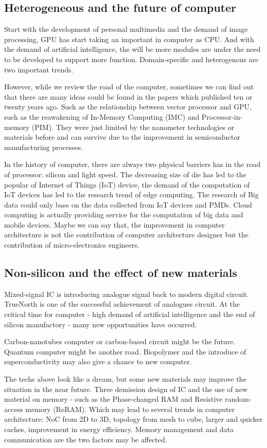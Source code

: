 \subsection{Heterogeneous and the future of computer}
\par Start with the development of personal multimedia and the demand of image processing, GPU has start taking an important in computer as CPU. And with the demand of artificial intelligence, the will be more modules are under the need to be developed to support more function. Domain-specific and heterogenous are two important trends\cite{chung2010single}\cite{hennessy2017computer}\cite{taylor2012dark}. 
\par However, while we review the road of the computer, sometimes we can find out that there are many ideas could be found in the papers which published ten or twenty years ago. Such as the relationship between vector processor and GPU, such as the reawakening of In-Memory Computing (IMC) and Processor-in-memory (PIM). They were just limited by the nanometer technologies or materials before and can survive due to the improvement in semiconductor manufacturing processes. 
\par In the history of computer, there are always two physical barriers has in the road of processor: silicon and light speed. The decreasing size of die has led to the popular of Internet of Things (IoT) device, the demand of the computation of IoT devices has led to the research trend of edge computing. The research of Big data could only base on the data collected from IoT devices and PMDs. Cloud computing is actually providing service for the computation of big data and mobile devices. Maybe we can say that, the improvement in computer architecture is not the contribution of computer architecture designer but the contribution of micro-electronics engineers. 
\subsection{Non-silicon and the effect of new materials}
\par Mixed-signal IC is introducing analogue signal back to modern digital circuit. TrueNorth\cite{merolla2014million} is one of the successful achievement of analogues circuit. At the critical time for computer - high demand of artificial intelligence and the end of silicon manufactory - many new opportunities have occurred. 
\par Carbon-nanotubes computer\cite{kreupl2013electronics} or carbon-based circuit might be the future. Quantum computer might be another road. Biopolymer and the introduce of superconductivity\cite{manheimer2015cryogenic} may also give a chance to new computer. 
\par The techs above look like a dream, but some new materials may improve the situation in the near future. Three demission design of IC and the use of new material on memory - such as the Phase-changed RAM\cite{hatayama2018inverse} and Resistive random-access memory (ReRAM)\cite{akinaga2010resistive}. Which may lead to several trends in computer architecture: NoC from 2D to 3D, topology from mesh to cube, larger and quicker caches, improvement in energy efficiency. Memory management and data communication are the two factors may be affected. 
